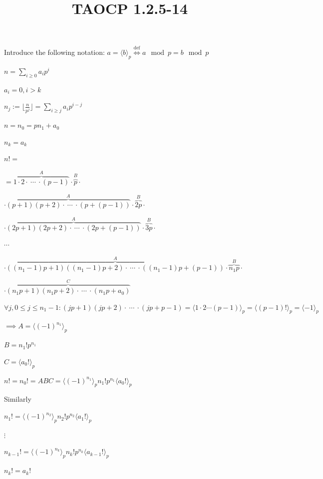 \documentclass{article}
\title{TAOCP 1.2.5\mbox{-}14}
\begin{document}
\maketitle

Introduce the following notation: \( a = \langle{b} \rangle_{p} \overset{\mathrm{def}}{\iff} a \mod p = b \mod p \)

\( n = \sum_{i \geq 0}{a_{i} p^{i}} \)

\( a_{i} = 0, i > k \)

\( n_{j} := \lfloor{\frac{n}{p^{j}}}\rfloor = \sum_{i \geq j}{a_{i} p^{i-j}} \)

\( n = n_{0} = pn_{1} + a_{0} \)

\( n_{k} = a_{k} \)

\( n! = \)

\( = \overbrace{1 \cdot 2  \cdot\ \cdots\ \cdot (p - 1)}^{A} \cdot \overbrace{p}^{B} \cdot \)

\( \cdot \overbrace{(p+1)(p+2) \cdot\ \cdots\ \cdot (p+(p-1))}^{A} \cdot \overbrace{2p}^{B} \cdot \)

\( \cdot \overbrace{(2p+1)(2p+2) \cdot\ \cdots\ \cdot (2p+(p-1))}^{A} \cdot \overbrace{3p}^{B} \cdot \)

\( \cdots \)

\( \cdot \overbrace{((n_{1}-1)p+1)((n_{1}-1)p+2) \cdot\ \cdots\ \cdot ((n_{1}-1)p+(p-1))}^{A} \cdot \overbrace{n_{1}p}^{B} \cdot \)

\( \cdot \overbrace{(n_{1}p+1)(n_{1}p+2) \cdot\ \cdots\ \cdot (n_{1}p+a_{0})}^{C} \)

\( \forall j, 0 \leq j \leq n_{1} - 1: (jp+1)(jp+2) \cdot\ \cdots\ \cdot (jp+p-1) = \langle{1 \cdot 2 \cdots (p-1)}\rangle_{p} = \langle{(p-1)!}\rangle_{p} = \langle{-1}\rangle_{p} \)

\( \implies A = \langle{(-1)}^{n_{1}}\rangle_{p} \)

\( B = n_{1}!p^{n_{1}} \)

\( C = \langle{a_{0}!}\rangle_{p} \)

\( n! = n_{0}! = ABC = \langle{{(-1)}^{n_{1}}}\rangle_{p} n_{1}!p^{n_{1}}\langle{a_{0}!}\rangle_{p} \)

Similarly

\( n_{1}! = \langle{{(-1)}^{n_{2}}}\rangle_{p} n_{2}!p^{n_{2}}\langle{a_{1}!}\rangle_{p} \)

\( \vdots \)

\( n_{k-1}! = \langle{{(-1)}^{n_{k}}}\rangle_{p} n_{k}!p^{n_{k}}\langle{a_{k-1}!}\rangle_{p} \)

\( n_{k}! = a_{k}! \)
\end{document}
